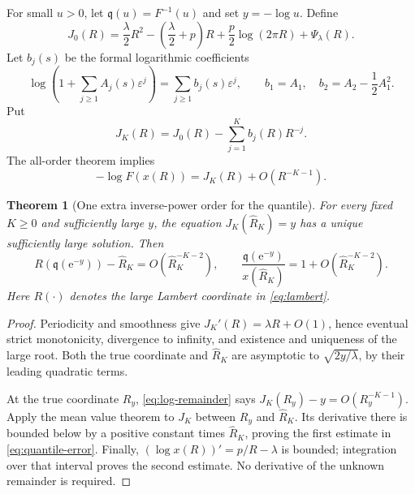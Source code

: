 \documentclass[11pt,a4paper]{article}
\numberwithin{equation}{section}
\newtheorem{theorem}{Theorem}[section]
\theoremstyle{definition}
\newcommand{\ee}{\mathrm e}
\begin{document}
For small $u>0$, let $\mathfrak q(u)=F^{-1}(u)$ and set $y=-\log u$. Define
\begin{equation}
 J_0(R)=\frac\lambda2R^2-\left(\frac\lambda2+p\right)R
       +\frac p2\log(2\pi R)+\Psi_\lambda(R).
 \label{eq:J0}
\end{equation}
Let $b_j(s)$ be the formal logarithmic coefficients
\begin{equation}
 \log\left(1+\sum_{j\geq1}A_j(s)\varepsilon^j\right)
 =\sum_{j\geq1}b_j(s)\varepsilon^j,
 \qquad b_1=A_1,\quad b_2=A_2-\frac12A_1^2.
 \label{eq:bj}
\end{equation}
Put
\begin{equation}
 J_K(R)=J_0(R)-\sum_{j=1}^K b_j(R)R^{-j}.
 \label{eq:JK}
\end{equation}
The all-order theorem implies
\begin{equation}
 -\log F(x(R))=J_K(R)+O(R^{-K-1}).
 \label{eq:log-remainder}
\end{equation}

\begin{theorem}[One extra inverse-power order for the quantile]
\label{thm:quantile}
For every fixed $K\geq0$ and sufficiently large $y$, the equation
$J_K(\widehat R_K)=y$ has a unique sufficiently large solution. Then
\begin{equation}
 R(\mathfrak q(\ee^{-y}))-\widehat R_K
   =O(\widehat R_K^{-K-2}),
 \qquad
 \frac{\mathfrak q(\ee^{-y})}{x(\widehat R_K)}
   =1+O(\widehat R_K^{-K-2}).
 \label{eq:quantile-error}
\end{equation}
Here $R(\cdot)$ denotes the large Lambert coordinate in \eqref{eq:lambert}.
\end{theorem}

\begin{proof}
Periodicity and smoothness give $J_K'(R)=\lambda R+O(1)$, hence eventual strict monotonicity, divergence to infinity, and existence and uniqueness of the large root. Both the true coordinate and $\widehat R_K$ are asymptotic to $\sqrt{2y/\lambda}$, by their leading quadratic terms.

At the true coordinate $R_y$, \eqref{eq:log-remainder} says
$J_K(R_y)-y=O(R_y^{-K-1})$. Apply the mean value theorem to $J_K$ between $R_y$ and $\widehat R_K$. Its derivative there is bounded below by a positive constant times $\widehat R_K$, proving the first estimate in \eqref{eq:quantile-error}. Finally,
$(\log x(R))'=p/R-\lambda$ is bounded; integration over that interval proves the second estimate. No derivative of the unknown remainder is required.
\end{proof}
\end{document}
